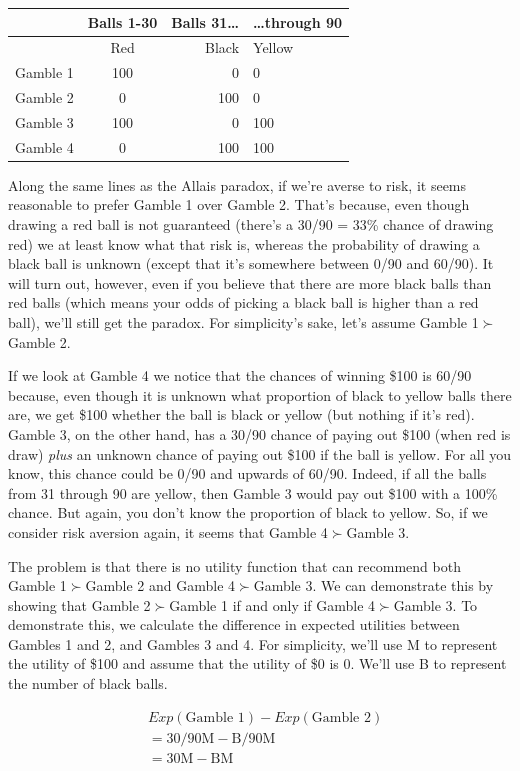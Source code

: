 \documentclass[]{tufte-book}
\begin{document}
\begin{longtable}[]{@{}lcrl@{}}
\toprule
& Balls 1-30 & Balls 31\ldots{} & \ldots through 90\tabularnewline
\midrule
\endhead
& Red & Black & Yellow\tabularnewline
Gamble 1 & 100 & 0 & 0\tabularnewline
Gamble 2 & 0 & 100 & 0\tabularnewline
Gamble 3 & 100 & 0 & 100\tabularnewline
Gamble 4 & 0 & 100 & 100\tabularnewline
\bottomrule
\end{longtable}

Along the same lines as the Allais paradox, if we're averse to risk, it seems reasonable to prefer Gamble 1 over Gamble 2. That's because, even though drawing a red ball is not guaranteed (there's a 30/90 = 33\% chance of drawing red) we at least know what that risk is, whereas the probability of drawing a black ball is unknown (except that it's somewhere between 0/90 and 60/90). It will turn out, however, even if you believe that there are more black balls than red balls (which means your odds of picking a black ball is higher than a red ball), we'll still get the paradox. For simplicity's sake, let's assume Gamble 1\(\succ\)Gamble 2.

If we look at Gamble 4 we notice that the chances of winning \$100 is 60/90 because, even though it is unknown what proportion of black to yellow balls there are, we get \$100 whether the ball is black or yellow (but nothing if it's red). Gamble 3, on the other hand, has a 30/90 chance of paying out \$100 (when red is draw) \emph{plus} an unknown chance of paying out \$100 if the ball is yellow. For all you know, this chance could be 0/90 and upwards of 60/90. Indeed, if all the balls from 31 through 90 are yellow, then Gamble 3 would pay out \$100 with a 100\% chance. But again, you don't know the proportion of black to yellow. So, if we consider risk aversion again, it seems that Gamble 4\(\succ\)Gamble 3.

The problem is that there is no utility function that can recommend both Gamble 1\(\succ\)Gamble 2 and Gamble 4\(\succ\)Gamble 3. We can demonstrate this by showing that Gamble 2\(\succ\)Gamble 1 if and only if Gamble 4\(\succ\)Gamble 3. To demonstrate this, we calculate the difference in expected utilities between Gambles 1 and 2, and Gambles 3 and 4. For simplicity, we'll use M to represent the utility of \$100 and assume that the utility of \$0 is 0. We'll use B to represent the number of black balls.

\[
\begin{split}
& Exp(\text{Gamble 1}) - Exp(\text{Gamble 2})  \\
&= 30/90\text{M} - \text{B}/90\text{M}  \\
&= 30\text{M} - \text{BM}
\end{split}
\]
\end{document}
